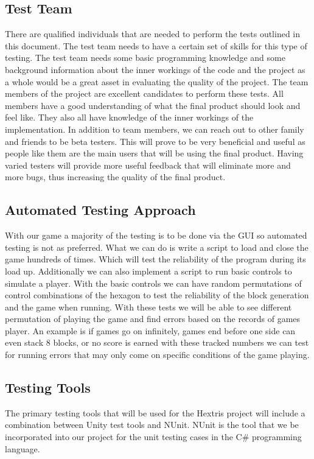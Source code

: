 \documentclass[12pt, titlepage]{article}
\begin{document}
\subsection{Test Team}
There are qualified individuals that are needed to perform the tests outlined in this document. The test team needs to have a certain set of skills for this type of testing. The test team needs some basic programming knowledge and some background information about the inner workings of the code and the project as a whole would be a great asset in evaluating the quality of the project. The team members of the project are excellent candidates to perform these tests. All members have a good understanding of what the final product should look and feel like. They also all have knowledge of the inner workings of the implementation. In addition to team members, we can reach out to other family and friends to be beta testers. This will prove to be very beneficial and useful as people like them are the main users that will be using the final product. Having varied testers will provide more useful feedback that will eliminate more and more bugs, thus increasing the quality of the final product.
\subsection{Automated Testing Approach}
With our game a majority of the testing is to be done via the GUI so automated testing is not as preferred. What we can do is write a script to load and close the game hundreds of times. Which will test the reliability of the program during its load up. Additionally we can also implement a script to run basic controls to simulate a player. With the basic controls we can have random permutations of control combinations of the hexagon to test the reliability of the block generation and the game when running. With these tests we will be able to see different permutation of playing the game and find errors based on the records of games player. An example is if games go on infinitely, games end before one side can even stack 8 blocks, or no score is earned with these tracked numbers we can test for running errors that may only come on specific conditions of the game playing.  
\subsection{Testing Tools}
The primary testing tools that will be used for the Hextris project will include a combination between Unity test tools and NUnit. NUnit is the tool that we be incorporated into our project for the unit testing cases in the C\# programming language.\\
\end{document}
